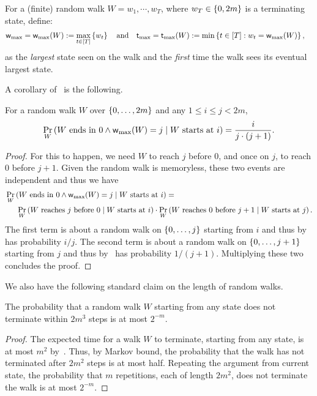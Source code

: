 For a (finite) random walk $W = w_1,\cdots,w_T$, where $w_T \in \left\{ 0,2m \right\}$ is a terminating state, define: 
\begin{align*}
	\textnormal{\textsf{w}}_{\textnormal{max}} &= \textnormal{\textsf{w}}_{\textnormal{max}}(W) := \max_{t \in [T]} \left\{ w_t \right\} \quad \text{and}\quad 
	\textnormal{\textsf{t}}_{\textnormal{max}} = \textnormal{\textsf{t}}_{\textnormal{max}}(W) := \min \left\{ t \in [T] : w_t=\textnormal{\textsf{w}}_{\textnormal{max}}(W) \right\},  
\end{align*}
as the \emph{largest} state seen on the walk and the \emph{first} time the walk sees its eventual largest state. 

A corollary of~ is the following. 
\begin{claim}\label{clm:ruin}
	For a random walk $W$ over $\left\{ 0,\ldots,2m \right\}$ and any $1 \leq i \leq j < 2m$,
	\[
		\operatorname*{\textnormal{Pr}}_W\left(\text{$W$ ends in $0$} \wedge \textnormal{\textsf{w}}_{\textnormal{max}}(W) = j \mid \text{$W$ starts at $i$}\right) = \frac{i}{j \cdot (j+1)}. 
	\]
\end{claim}
\begin{proof}
	For this to happen, we need $W$ to reach $j$ before $0$, and once on $j$, to reach $0$ before $j+1$. Given the random walk is memoryless, these two events are independent and thus we have
	\begin{align*}
		&\operatorname*{\textnormal{Pr}}_W\left(\text{$W$ ends in $0$} \wedge \textnormal{\textsf{w}}_{\textnormal{max}}(W) = j \mid \text{$W$ starts at $i$}\right) = \\
		&\hspace{15pt} \operatorname*{\textnormal{Pr}}_W\left(\text{$W$ reaches $j$ before $0$} \mid \text{$W$ starts at $i$}\right) \cdot  \operatorname*{\textnormal{Pr}}_W\left(\text{$W$ reaches $0$ before $j+1$} \mid \text{$W$ starts at $j$}\right). 
	\end{align*}
	The first term is about a random walk on $\left\{ 0,\ldots,j \right\}$ starting from $i$ and thus by~ has probability $i/j$. The second term is about a random walk on $\left\{ 0,\ldots,j+1 \right\}$ starting from $j$
	and thus by~ has probability $1/(j+1)$. Multiplying these two concludes the proof. 
\end{proof}
We also have the following standard claim on the length of random walks. 
\begin{claim}\label{clm:walk-length}
	The probability that a random walk $W$ starting from any state does not terminate within $2m^3$ steps is at most $2^{-m}$. 
\end{claim}
\begin{proof}
	The expected time for a walk $W$ to terminate, starting from any state, is at most $m^2$ by~. 
	Thus, by Markov bound, the probability that the walk has not terminated after $2m^2$ steps is at most half. Repeating the argument from current state, 
	the probability that $m$ repetitions, each of length $2m^2$, does not terminate the walk is at most $2^{-m}$. 
\end{proof}
